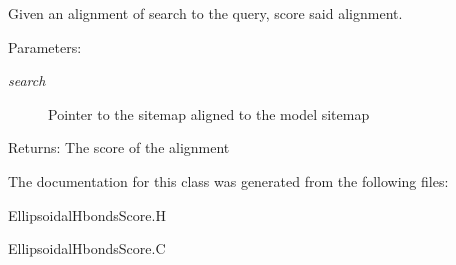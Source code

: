 Given an alignment of search to the query, score said alignment. 

\begin{Desc}
\item[Parameters:]
\begin{description}
\item[{\em search}]Pointer to the sitemap aligned to the model sitemap \end{description}
\end{Desc}
\begin{Desc}
\item[Returns:]The score of the alignment \end{Desc}


The documentation for this class was generated from the following files:\begin{CompactItemize}
\item 
Ellipsoidal\-Hbonds\-Score.H\item 
Ellipsoidal\-Hbonds\-Score.C\end{CompactItemize}
